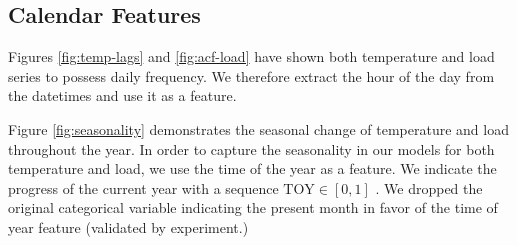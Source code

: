 \documentclass[conference]{IEEEtran}
\begin{document}
\subsection{Calendar Features}
\label{sec:calendar}
Figures \ref{fig:temp-lags} and \ref{fig:acf-load} have shown both temperature and load series to possess daily frequency. We therefore extract the hour of the day from the datetimes and use it as a feature. 

Figure \ref{fig:seasonality} demonstrates the seasonal change of temperature and load throughout the year. In order to capture the seasonality in our models for both temperature and load, we use the time of the year as a feature. We indicate the progress of the current year with a sequence $\text{TOY} \in [0,1]$ \cite{Fan2010}. We dropped the original categorical variable indicating the present month in favor of the time of year feature (validated by experiment.) 
\end{document}
